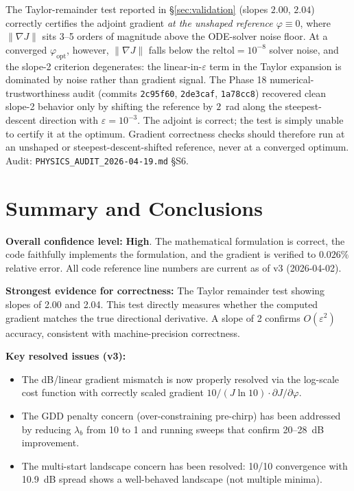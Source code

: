 \documentclass[12pt,a4paper]{article}
\theoremstyle{definition}
\begin{document}
The Taylor-remainder test reported in §\ref{sec:validation} (slopes
$2.00$, $2.04$) correctly certifies the adjoint gradient \emph{at the
unshaped reference $\varphi \equiv 0$}, where $\|\nabla J\|$ sits
3--5 orders of magnitude above the ODE-solver noise floor. At a
converged $\varphi_\text{opt}$, however, $\|\nabla J\|$ falls below
the $\mathrm{reltol} = 10^{-8}$ solver noise, and the slope-2
criterion degenerates: the linear-in-$\varepsilon$ term in the Taylor
expansion is dominated by noise rather than gradient signal. The
Phase 18 numerical-trustworthiness audit (commits
\texttt{2c95f60}, \texttt{2de3caf}, \texttt{1a78cc8}) recovered clean
slope-2 behavior only by shifting the reference by $2$~rad along the
steepest-descent direction with $\varepsilon = 10^{-3}$. The adjoint
is correct; the test is simply unable to certify it at the optimum.
Gradient correctness checks should therefore run at an unshaped or
steepest-descent-shifted reference, never at a converged optimum.
Audit: \texttt{PHYSICS\_AUDIT\_2026-04-19.md} §S6.

\section*{Summary and Conclusions}

\textbf{Overall confidence level:} \textcolor{green!60!black}{\textbf{High}}. The mathematical formulation is correct, the code faithfully implements the formulation, and the gradient is verified to $0.026\%$ relative error. All code reference line numbers are current as of v3 (2026-04-02).

\textbf{Strongest evidence for correctness:} The Taylor remainder test showing slopes of 2.00 and 2.04. This test directly measures whether the computed gradient matches the true directional derivative. A slope of 2 confirms $O(\varepsilon^2)$ accuracy, consistent with machine-precision correctness.

\textbf{Key resolved issues (v3):}
\begin{itemize}[leftmargin=*]
\item The dB/linear gradient mismatch is now properly resolved via the log-scale cost function with correctly scaled gradient $10/(J\ln 10) \cdot \partial J/\partial\varphi$.
\item The GDD penalty concern (over-constraining pre-chirp) has been addressed by reducing $\lambda_b$ from 10 to 1 and running sweeps that confirm 20--28~dB improvement.
\item The multi-start landscape concern has been resolved: 10/10 convergence with 10.9~dB spread shows a well-behaved landscape (not multiple minima).
\end{itemize}
\end{document}
